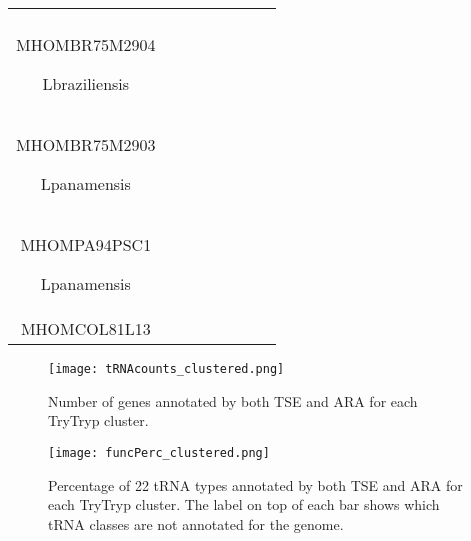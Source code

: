 \documentclass[
10pt, %
a4paper, %
oneside, %
headinclude,footinclude, %
BCOR5mm, %
]{scrartcl}
\begin{document}
\begin{table}[hbt]
\begin{adjustbox}{width=\columnwidth,center}
\begin{tabular}{|c|c|c|c|c|c|c|c|}
{\begin{enumerate}
            \item Lbraziliensis\\MHOMBR75M2904
            \item Lbraziliensis\\MHOMBR75M2903
            \item Lpanamensis\\MHOMPA94PSC1
            \item Lpanamensis\\MHOMCOL81L13
        \end{enumerate}}\\
        \bottomrule
\end{tabular}
\label{table:4}
\end{adjustbox}
\end{table}

\begin{figure}[tb]
\centering 
\texttt{[image: tRNAcounts\_clustered.png]} 
\caption[Number of Genes annotated]{Number of genes annotated by both TSE and ARA for each TryTryp cluster.}
\label{fig:countsclustered} 
\end{figure}

\begin{figure}[tb]
\centering 
\texttt{[image: funcPerc\_clustered.png]} 
\caption[Genome Comparison]{Percentage of 22 tRNA types annotated by both TSE and ARA for each TryTryp cluster. The label on top of each bar shows which tRNA classes are not annotated for the genome.} 
\label{fig:funcclustered} 
\end{figure}
\newpage
\renewcommand{\refname}{\spacedlowsmallcaps{References}} %




\end{document}
